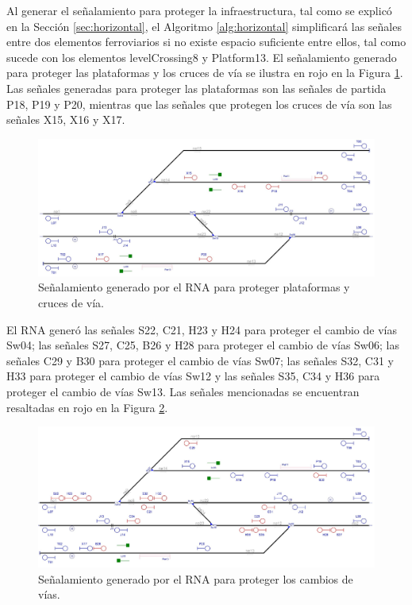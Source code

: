 	Al generar el señalamiento para proteger la infraestructura, tal como se explicó en la Sección \ref{sec:horizontal}, el Algoritmo \ref{alg:horizontal} simplificará las señales entre dos elementos ferroviarios si no existe espacio suficiente entre ellos, tal como sucede con los elementos levelCrossing8 y Platform13. El señalamiento generado para proteger las plataformas y los cruces de vía se ilustra en rojo en la Figura \ref{fig:EJ1_5}. Las señales generadas para proteger las plataformas son las señales de partida P18, P19 y P20, mientras que las señales que protegen los cruces de vía son las señales X15, X16 y X17.
		
	\begin{figure}[H]
		\centering
		\includegraphics[width=1\textwidth]{resultados-obtenidos/ejemplo1/images/1_step3.png}
		\centering\caption{Señalamiento generado por el RNA para proteger plataformas y cruces de vía.}
		\label{fig:EJ1_5}
	\end{figure}
	
	El RNA generó las señales S22, C21, H23 y H24 para proteger el cambio de vías Sw04; las señales S27, C25, B26 y H28 para proteger el cambio de vías Sw06; las señales C29 y B30 para proteger el cambio de vías Sw07; las señales S32, C31 y H33 para proteger el cambio de vías Sw12 y las señales S35, C34 y H36 para proteger el cambio de vías Sw13. Las señales mencionadas se encuentran resaltadas en rojo en la Figura \ref{fig:EJ1_6}.
	
	\begin{figure}[H]
		\centering
		\includegraphics[width=1\textwidth]{resultados-obtenidos/ejemplo1/images/1_step4.png}
		\centering\caption{Señalamiento generado por el RNA para proteger los cambios de vías.}
		\label{fig:EJ1_6}
	\end{figure}
	
